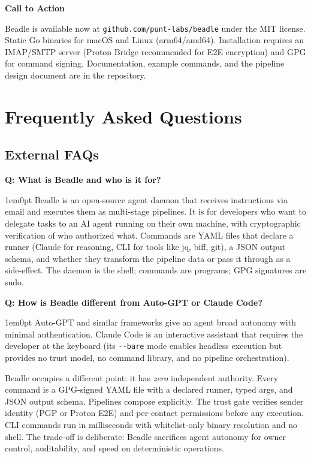 \documentclass[11pt,letterpaper]{article}
\newcommand{\prsection}[1]{%
  \vspace{1em}%
  {\large\bfseries\color{SectionBlue}#1}%
  \vspace{0.3em}\par%
}
\newcounter{faqnum}
\newenvironment{faqpair}[1]{%
  \needspace{4\baselineskip}%
  \vspace{0.5em}%
  \refstepcounter{faqnum}%
  \noindent\textbf{\color{SectionBlue}Q\thefaqnum: #1}\par\nopagebreak[4]%
  \vspace{0.2em}%
  \begin{adjustwidth}{1em}{0pt}%
  \setlength{\parindent}{0pt}%
}{%
  \end{adjustwidth}%
  \vspace{0.5em}%
}
\begin{document}
\prsection{Call to Action}

Beadle is available now at
{\small\texttt{github.com/punt-labs/beadle}} under the MIT license.
Static Go binaries for macOS and Linux (arm64/amd64). Installation
requires an IMAP/SMTP server (Proton Bridge recommended for E2E
encryption) and GPG for command signing. Documentation, example
commands, and the pipeline design document are in the repository.

\newpage


\section*{Frequently Asked Questions}


\subsection*{External FAQs}

\begin{faqpair}{What is Beadle and who is it for?}\label{faq:what-is-it}
  Beadle is an open-source agent daemon that receives instructions via email
  and executes them as multi-stage pipelines. It is for developers who want
  to delegate tasks to an AI agent running on their own machine, with
  cryptographic verification of who authorized what. Commands are YAML files
  that declare a runner (Claude for reasoning, CLI for tools like jq, biff,
  git), a JSON output schema, and whether they transform the pipeline data
  or pass it through as a side-effect. The daemon is the shell; commands
  are programs; GPG signatures are sudo.
\end{faqpair}

\begin{faqpair}{How is Beadle different from Auto-GPT or Claude Code?}\label{faq:competitors}
  Auto-GPT and similar frameworks give an agent broad autonomy with minimal
  authentication. Claude Code is an interactive assistant that requires the
  developer at the keyboard (its \texttt{-{}-bare} mode enables headless
  execution but provides no trust model, no command library, and no pipeline
  orchestration).

  Beadle occupies a different point: it has \textit{zero} independent authority.
  Every command is a GPG-signed YAML file with a declared runner, typed args,
  and JSON output schema. Pipelines compose explicitly. The trust gate verifies
  sender identity (PGP or Proton E2E) and per-contact permissions before any
  execution. CLI commands run in milliseconds with whitelist-only binary
  resolution and no shell. The trade-off is deliberate: Beadle sacrifices agent
  autonomy for owner control, auditability, and speed on deterministic operations.
\end{faqpair}
\end{document}
